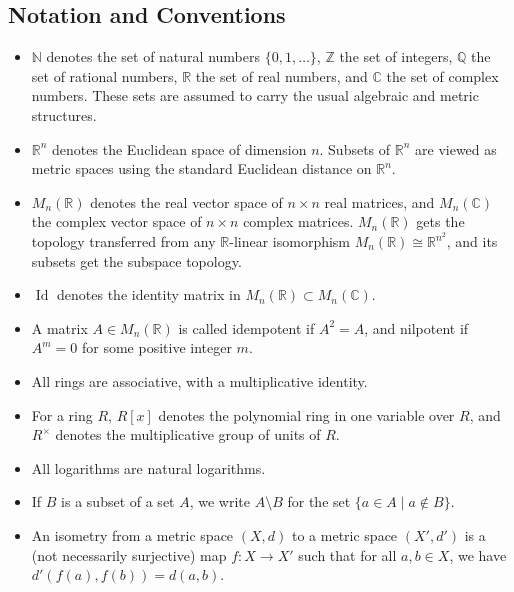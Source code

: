 \documentclass[11pt, a4paper]{article}
\begin{document}
\subsection*{Notation and Conventions}
\begin{itemize}
  \item $\mathbb{N}$ denotes the set of natural numbers $\{0, 1, \dots\}$, $\mathbb{Z}$ the set of integers, $\mathbb{Q}$ the set of rational numbers, $\mathbb{R}$ the set of real numbers, and $\mathbb{C}$ the set of complex numbers. These sets are assumed to carry the usual algebraic and metric structures.
  \item $\mathbb{R}^n$ denotes the Euclidean space of dimension $n$. Subsets of $\mathbb{R}^n$ are viewed as metric spaces using the standard Euclidean distance on $\mathbb{R}^n$.
  \item $M_n(\mathbb{R})$ denotes the real vector space of $n \times n$ real matrices, and $M_n(\mathbb{C})$ the complex vector space of $n \times n$ complex matrices. $M_n(\mathbb{R})$ gets the topology transferred from any $\mathbb{R}$-linear isomorphism $M_n(\mathbb{R}) \cong \mathbb{R}^{n^2}$, and its subsets get the subspace topology.
  \item $\operatorname{Id}$ denotes the identity matrix in $M_n(\mathbb{R}) \subset M_n(\mathbb{C})$.
  \item A matrix $A \in M_n(\mathbb{R})$ is called idempotent if $A^2 = A$, and nilpotent if $A^m = 0$ for some positive integer $m$.
  \item All rings are associative, with a multiplicative identity.
  \item For a ring $R$, $R[x]$ denotes the polynomial ring in one variable over $R$, and $R^\times$ denotes the multiplicative group of units of $R$.
  \item All logarithms are natural logarithms.
  \item If $B$ is a subset of a set $A$, we write $A \setminus B$ for the set $\{a \in A \mid a \notin B\}$.
  \item An isometry from a metric space $(X, d)$ to a metric space $(X', d')$ is a (not necessarily surjective) map $f: X \to X'$ such that for all $a, b \in X$, we have $d'(f(a), f(b)) = d(a, b)$.
\end{itemize}
\end{document}
